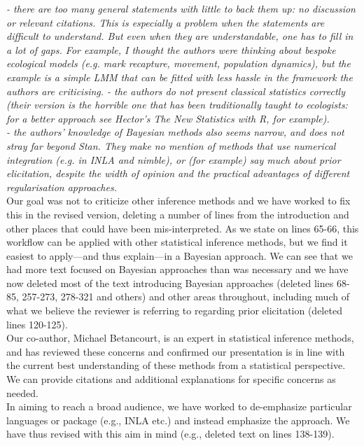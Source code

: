 \documentclass[11pt,a4paper]{article}
\begin{document}
\emph{- there are too many general statements with little to back them up: no discussion or relevant citations. This is especially a problem when the statements are difficult to understand. But even when they are understandable, one has to fill in a lot of gaps. For example, I thought the authors were thinking about bespoke ecological models (e.g. mark recapture, movement, population dynamics), but the example is a simple LMM that can be fitted with less hassle in the framework the authors are criticising. - the authors do not present classical statistics correctly (their version is the horrible one that has been traditionally taught to ecologists: for a better approach see Hector's The New Statistics with R, for example).}\\

\emph{- the authors' knowledge of Bayesian methods also seems narrow, and does not stray far beyond Stan. They make no mention of methods that use numerical integration (e.g. in INLA and nimble), or (for example) say much about prior elicitation, despite the width of opinion and the practical advantages of different regularisation approaches.}\\

Our goal was not to criticize other inference methods and we have worked to fix this in the revised version, deleting a number of lines from the introduction and other places that could have been mis-interpreted. As we state on lines 65-66, this workflow can be applied with other statistical inference methods, but we find it easiest to apply---and thus explain---in a Bayesian approach. We can see that we had more text focused on Bayesian approaches than was necessary and we have now deleted most of the text introducing Bayesian approaches (deleted lines 68-85, 257-273, 278-321 and others) and other areas throughout, including much of what we believe the reviewer is referring to regarding prior elicitation (deleted lines 120-125).\\

Our co-author, Michael Betancourt, is an expert in statistical inference methods, and has reviewed these concerns and confirmed our presentation is in line with the current best understanding of these methods from a statistical perspective. We can provide citations and additional explanations for specific concerns as needed. \\

In aiming to reach a broad audience, we have worked to de-emphasize particular languages or package (e.g., INLA etc.) and instead emphasize the approach. We have thus revised with this aim in mind (e.g., deleted text on lines 138-139). \\
\end{document}
